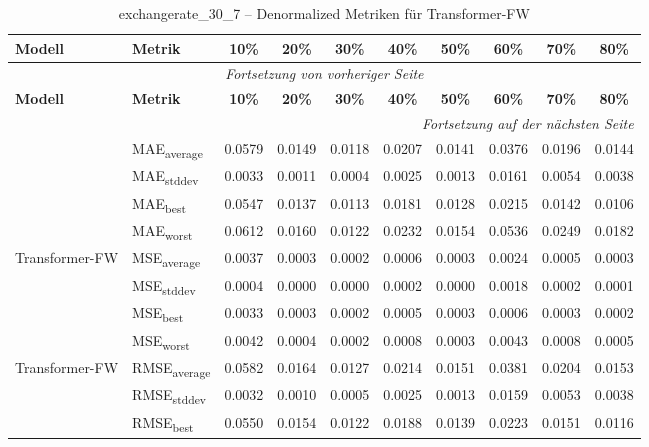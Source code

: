 {\small
\begin{longtable}{l l c c c c c c c c}
    \toprule
    \textbf{Modell} & \textbf{Metrik} & \textbf{10\%} & \textbf{20\%} & \textbf{30\%} & \textbf{40\%} & \textbf{50\%} & \textbf{60\%} & \textbf{70\%} & \textbf{80\%} \\
    \midrule
    \endfirsthead
    \multicolumn{10}{c}{\textit{Fortsetzung von vorheriger Seite}} \\
    \toprule
    \textbf{Modell} & \textbf{Metrik} & \textbf{10\%} & \textbf{20\%} & \textbf{30\%} & \textbf{40\%} & \textbf{50\%} & \textbf{60\%} & \textbf{70\%} & \textbf{80\%} \\
    \midrule
    \endhead
    \midrule
    \multicolumn{10}{r}{\textit{Fortsetzung auf der nächsten Seite}} \\
    \midrule
    \endfoot
    \bottomrule
    \caption{exchangerate_30_7 -- Denormalized Metriken für Transformer-FW}
    \label{tab:exchangerate_30_7_denormalized_transformer-fw}
    \endlastfoot
\multirow{4}{*}{Transformer-FW} & MAE\textsubscript{average} & 0.0579 & 0.0149 & 0.0118 & 0.0207 & 0.0141 & 0.0376 & 0.0196 & 0.0144 \\
 & MAE\textsubscript{stddev} & 0.0033 & 0.0011 & 0.0004 & 0.0025 & 0.0013 & 0.0161 & 0.0054 & 0.0038 \\
 & MAE\textsubscript{best} & 0.0547 & 0.0137 & 0.0113 & 0.0181 & 0.0128 & 0.0215 & 0.0142 & 0.0106 \\
 & MAE\textsubscript{worst} & 0.0612 & 0.0160 & 0.0122 & 0.0232 & 0.0154 & 0.0536 & 0.0249 & 0.0182 \\
\cmidrule(lr){2-10}
\multirow{4}{*}{Transformer-FW} & MSE\textsubscript{average} & 0.0037 & 0.0003 & 0.0002 & 0.0006 & 0.0003 & 0.0024 & 0.0005 & 0.0003 \\
 & MSE\textsubscript{stddev} & 0.0004 & 0.0000 & 0.0000 & 0.0002 & 0.0000 & 0.0018 & 0.0002 & 0.0001 \\
 & MSE\textsubscript{best} & 0.0033 & 0.0003 & 0.0002 & 0.0005 & 0.0003 & 0.0006 & 0.0003 & 0.0002 \\
 & MSE\textsubscript{worst} & 0.0042 & 0.0004 & 0.0002 & 0.0008 & 0.0003 & 0.0043 & 0.0008 & 0.0005 \\
\cmidrule(lr){2-10}
\multirow{4}{*}{Transformer-FW} & RMSE\textsubscript{average} & 0.0582 & 0.0164 & 0.0127 & 0.0214 & 0.0151 & 0.0381 & 0.0204 & 0.0153 \\
 & RMSE\textsubscript{stddev} & 0.0032 & 0.0010 & 0.0005 & 0.0025 & 0.0013 & 0.0159 & 0.0053 & 0.0038 \\
 & RMSE\textsubscript{best} & 0.0550 & 0.0154 & 0.0122 & 0.0188 & 0.0139 & 0.0223 & 0.0151 & 0.0116 \\

\end{longtable}}
